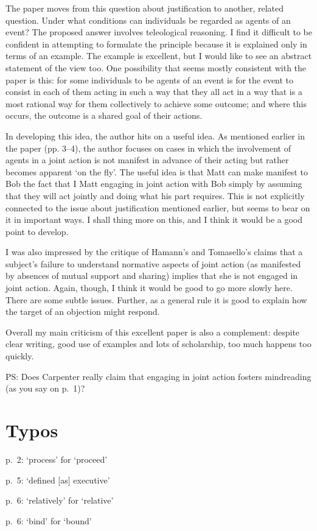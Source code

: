 \documentclass[12pt,a4paper]{extarticle}
\begin{document}
The paper moves from this question about justification to another, related question.
Under what conditions can individuals be regarded as agents of an event? 
The proposed answer involves teleological reasoning.
I find it difficult to be confident in attempting to formulate the principle because it is explained only in terms of an example.
The example is excellent, but I would like to see an abstract statement of the view too.
One possibility that seems mostly consistent with the paper is this: for some individuals to be agents of an event is for the event to consist in each of them acting in such a way that they all act in a way that is a most rational way for them collectively to achieve some outcome; and where this occurs, the outcome is a shared goal of their actions.

In developing this idea, the author hits on a useful idea. 
As mentioned earlier in the paper (pp. 3--4), the author focuses on cases in which the involvement of agents in a joint action is not manifest in advance of their acting but rather becomes apparent ‘on the fly’. 
The useful idea is that Matt can make manifest to Bob the fact that I Matt engaging in joint action with Bob simply by assuming that they will act jointly and doing what his part requires. 
This is not explicitly connected to the issue about justification mentioned earlier, but seems to bear on it in important ways.
I shall thing more on this, and I think it would be a good point to develop.

I was also impressed by the critique of Hamann’s and Tomasello’s claims that a subject’s failure to understand normative aspects of joint action (as manifested by absences of mutual support and sharing) implies that she is not engaged in joint action.
Again, though, I think it would be good to go more slowly here.
There are some subtle issues.
Further, as a general rule it is good to explain how the target of an objection might respond.

Overall my main criticism of this excellent paper is also a complement: despite clear writing, good use of examples and lots of scholarship, too much happens too quickly.
 

PS: Does Carpenter really claim that engaging in joint action fosters mindreading (as you say on p.\ 1)?



\section{Typos}
p.\ 2: ‘process’ for ‘proceed’

p.\ 5: ‘defined [as] executive’

p.\ 6: ‘relatively’ for ‘relative’

p.\ 6: ‘bind’ for ‘bound’






\small

\end{document}
